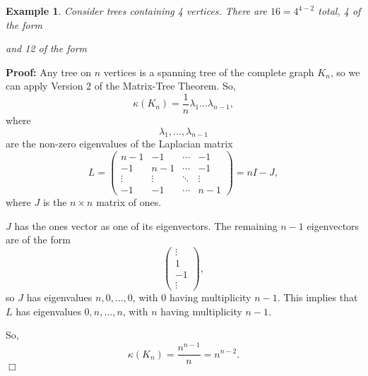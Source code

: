 \documentclass[11pt]{article}
\newtheorem{example}[theorem]{Example}
\newenvironment{proof}{\noindent \textbf{Proof:}}{$\Box$}
\begin{document}
\begin{example}
Consider trees containing 4 vertices.  There are $16 = 4^{4-2}$ total, 4 of the form

\begin{center}
\end{center}

and 12 of the form

\begin{center}
\end{center}
\end{example}

\begin{proof}
Any tree on $n$ vertices is a spanning tree of the complete graph $K_n$, so we can apply Version 2 of the Matrix-Tree Theorem.
So,
$$\kappa(K_n) = \frac{1}{n} \lambda_1 \ldots \lambda_{n-1},$$
where $$\lambda_1, \ldots, \lambda_{n-1}$$ are the non-zero eigenvalues of the Laplacian matrix
$$L = 
\begin{pmatrix}
n-1 & -1 & \cdots & -1 \\
-1 & n-1 & \cdots & -1 \\
\vdots & \vdots & \ddots & \vdots \\
-1 & -1 & \cdots & n-1
\end{pmatrix}
= nI - J,
$$
where $J$ is the $n \times n$ matrix of ones.

$J$ has the ones vector as one of its eigenvectors.  The remaining $n-1$ eigenvectors are of the form
$$
\begin{pmatrix}
\vdots\\
1 \\
-1 \\
\vdots
\end{pmatrix},
$$
so $J$ has eigenvalues $n, 0, \ldots, 0$, with 0 having multiplicity $n-1$.  This implies that $L$ has eigenvalues $0,n,\ldots,n$, with $n$ having multiplicity $n-1$.

So,
$$\kappa(K_n) = \frac{n^{n-1}}{n} = n^{n-2}.$$
\end{proof}
\end{document}
